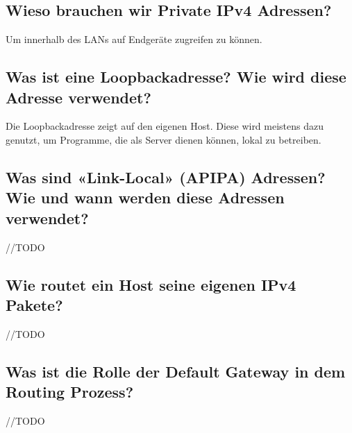 \subsection*{Wieso brauchen wir Private IPv4 Adressen?}
Um innerhalb des LANs auf Endgeräte zugreifen zu können.
\subsection*{Was ist eine Loopbackadresse? Wie wird diese Adresse verwendet?}
Die Loopbackadresse zeigt auf den eigenen Host. Diese wird meistens dazu genutzt, um Programme, die als Server dienen können, lokal zu betreiben.
\subsection*{Was sind «Link-Local» (APIPA) Adressen? Wie und wann werden diese Adressen verwendet?}
//TODO
\subsection*{Wie routet ein Host seine eigenen IPv4 Pakete?}
//TODO
\subsection*{Was ist die Rolle der Default Gateway in dem Routing Prozess?}
//TODO